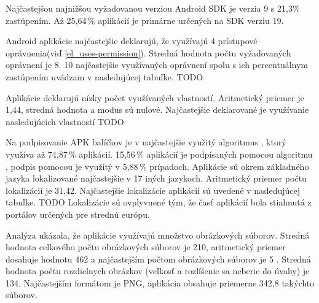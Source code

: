Najčastejšou najnižšou vyžadovanou verziou Android SDK je verzia 9 s 21,3\% zastúpením. Až 25,64\,\% aplikácií je primárne určených na SDK verziu 19.

Android aplikácie najčastejšie deklarujú, že využívajú 4 prístupové oprávnenia(viď \ref{el_uses-permission}). Stredná hodnota počtu vyžadovaných oprávnení je 8. 10 najčastejšie využívaných oprávnení spolu s ich percentuálnym zastúpením uvádzam v nasledujúcej tabuľke. TODO

Aplikácie deklarujú nízky počet využívaných vlastností. Aritmetický priemer je 1,44, stredná hodnota a modus sú nulové. Najčastejšie deklarované je využívanie nasledujúcich vlastností TODO

Na podpisovanie APK balíčkov je v najčastejšie využitý algoritmus , ktorý využíva až 74,87\,\% aplikácií. 15,56\,\% aplikácií je podpísaných pomocou algoritmu , podpis pomocou  je využitý v 5,88\,\% prípadoch.
Aplikácie sú okrem základného jazyka lokalizované najčastejšie v 17 iných jazykoch. Aritmetický priemer počtu lokalizácií je 31,42. Najčastejšie lokalizácie aplikácií sú uvedené v nasledujúcej tabuľke. TODO Lokalizácie sú ovplyvnené tým, že časť aplikácií bola stiahnutá z portálov určených pre strednú európu.

Analýza ukázala, že aplikácie využívajú množstvo obrázkových súborov. Stredná hodnota celkového počtu obrázkových súborov je 210, aritmetický priemer dosahuje hodnotu 462 a najčastejším počtom obrázkových súborov je 5 . Stredná hodnota počtu rozdielnych obrázkov (veľkosť a rozlíšenie sa neberie do úvahy) je 134. Najčastejším formátom je PNG, aplikácia obsahuje priemerne 342,8 takýchto súborov.